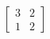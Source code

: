 \documentclass[preview]{standalone}
\begin{document}
\begin{center}
$\begin{bmatrix}3 & 2 \\ 1 & 2\end{bmatrix}$
\end{center}
\end{document}
